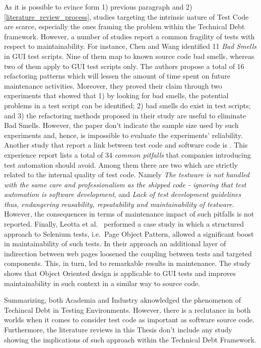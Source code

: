 As it is possible to evince form 1) previous paragraph and 2) \ref{literature_review_process}, studies targeting the intrinsic nature of Test Code are scarce, especially the ones framing the problem within the Technical Debt framework. However, a number of studies report a common fragility of tests with respect to maintainability. For instance, Chen and Wang \cite{gui_scripts_bad_smells} identified 11 \textit{Bad Smells} in GUI test scripts. Nine of them map to known source code bad smells, whereas two of them apply to GUI test scripts only. The authors propose a total of 16 refactoring patterns which will lessen the amount of time spent on future maintenance activities. Moreover, they proved their claim through two experiments that showed that 1) by looking for bad smells, the potential problems in a test script can be identified; 2) bad smells do exist in test scripts; and 3) the refactoring methods proposed in their study are useful to eliminate Bad Smells. However, the paper don't indicate the sample size used by such experiments and, hence, is impossible to evaluate the experiments' reliability. Another study that report a link between test code and software code is \cite{pitfalls_in_introducing_regression_testing}. This experience report lists a total of 34 \textit{common pitfalls} that companies introducing test automation should avoid. Among them there are two which are strictly related to the internal quality of test code. Namely \textit{The testware is not handled with the same care and professionalism as the shipped code - ignoring that test automation is software development}, and \textit{Lack of test development guidelines thus, endangering reusability, repeatability and maintainability of testware}. However, the consequences in terms of maintenance impact of such pitfalls is not reported. Finally, Leotta et al.\ \cite{pageObjectPattern} performed a case study in which a structured approach to Selenium tests, i.e.\ Page Object Pattern, allowed a significant boost in maintainability of such tests. In their approach an additional layer of indirection between web pages loosened the coupling between tests and targeted components. This, in turn, led to remarkable results in maintenance. The study shows that Object Oriented design is applicable to GUI tests and improves maintainability in such context in a similar way to source code.

Summarizing, both Academia and Industry aknowledged the phenomenon of Techincal Debt in Testing Environments. However, there is a reclutance in both worlds when it comes to consider test code as important as software source code. Furthermore, the literature reviews in this Thesis don't include any study showing the implications of such approach within the Technical Debt Framework.

